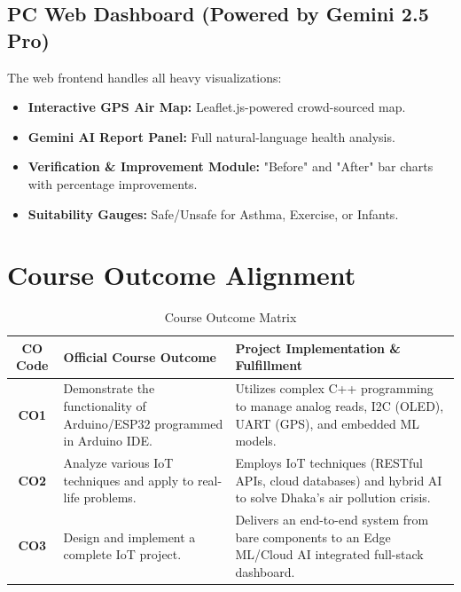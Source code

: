 \documentclass[12pt,a4paper]{report}
\begin{document}
\section{PC Web Dashboard (Powered by Gemini 2.5 Pro)}
The web frontend handles all heavy visualizations:
\begin{itemize}
    \item \textbf{Interactive GPS Air Map:} Leaflet.js-powered crowd-sourced map.
    \item \textbf{Gemini AI Report Panel:} Full natural-language health analysis.
    \item \textbf{Verification \& Improvement Module:} "Before" and "After" bar charts with percentage improvements.
    \item \textbf{Suitability Gauges:} Safe/Unsafe for Asthma, Exercise, or Infants.
\end{itemize}

\chapter{Course Outcome Alignment}
\begin{table}[H]
    \centering
    \begin{tabularx}{\textwidth}{|c|X|X|}
        \hline
        \textbf{CO Code} & \textbf{Official Course Outcome} & \textbf{Project Implementation \& Fulfillment} \\ \hline
        \textbf{CO1} & Demonstrate the functionality of Arduino/ESP32 programmed in Arduino IDE. & Utilizes complex C++ programming to manage analog reads, I2C (OLED), UART (GPS), and embedded ML models. \\ \hline
        \textbf{CO2} & Analyze various IoT techniques and apply to real-life problems. & Employs IoT techniques (RESTful APIs, cloud databases) and hybrid AI to solve Dhaka's air pollution crisis. \\ \hline
        \textbf{CO3} & Design and implement a complete IoT project. & Delivers an end-to-end system from bare components to an Edge ML/Cloud AI integrated full-stack dashboard. \\ \hline
    \end{tabularx}
    \caption{Course Outcome Matrix}
\end{table}

\end{document}
